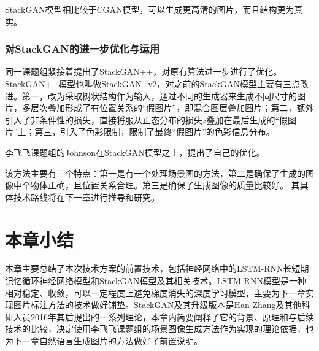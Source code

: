   StackGAN模型相比较于CGAN模型，可以生成更高清的图片，而且结构更为真实。

\subsubsection{对StackGAN的进一步优化与运用}
同一课题组紧接着提出了StackGAN++，对原有算法进一步进行了优化。StackGAN++模型也叫做StackGAN\_v2，对之前的StackGAN模型主要有三点改进。第一，改为采取树状结构作为输入，通过不同的生成器来生成不同尺寸的图片，多层次叠加形成了有位置关系的“假图片”，即混合图层叠加图片；第二，额外引入了非条件性的损失，直接将服从正态分布的损失$z$叠加在最后生成的“假图片”上；第三，引入了色彩限制，限制了最终“假图片”的色彩信息分布。

李飞飞课题组的Johnson在StackGAN模型之上，提出了自己的优化。

该方法主要有三个特点：第一是有一个处理场景图的方法，第二是确保了生成的图像中个物体正确，且位置关系合理。第三是确保了生成图像的质量比较好。
其具体技术路线将在下一章进行推导和研究。

\section{本章小结}
本章主要总结了本次技术方案的前置技术，包括神经网络中的LSTM-RNN长短期记忆循环神经网络模型和StackGAN模型及其相关技术。LSTM-RNN模型是一种相对稳定、收敛，可以一定程度上避免梯度消失的深度学习模型，主要为下一章实现图片标注方法的技术做好铺垫。StackGAN及其升级版本是Han Zhang及其他科研人员2016年其后提出的一系列理论，本章内简要阐释了它的背景、原理和与后续技术的比较，决定使用李飞飞课题组的场景图像生成方法作为实现的理论依据，也为下一章自然语言生成图片的方法做好了前置说明。